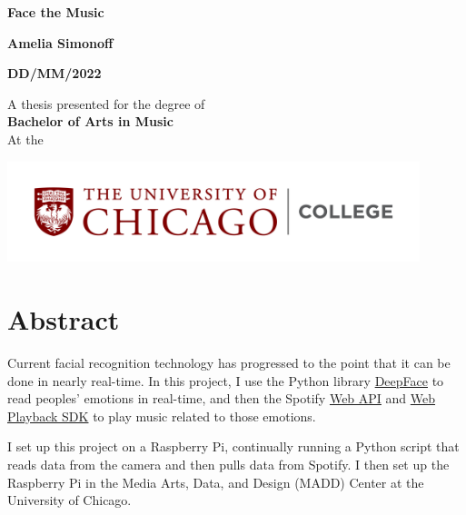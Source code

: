 \documentclass{article}
\title{}
\author{Amelia Simonoff, David Freedman}
\date{December 30 2020}
\renewcommand{\_}[1]{\underline{ #1 }}
\theoremstyle{definition}
\begin{document}
\begin{titlepage}
    \begin{center}
        \vspace*{1cm}
            
        \Huge
        \textbf{Face the Music}
            
        \vspace{0.5cm}
        \LARGE
            
        \vspace{1.5cm}
            
        \textbf{Amelia Simonoff}
        
        \textbf{DD/MM/2022}
            
        \vfill
            
        A thesis presented for the degree of\\
        \textbf{Bachelor of Arts in Music} \\
        At the
        
        \vspace{0.8cm}
            
        \includegraphics[width=0.9\textwidth]{UChicago_College_Horizontal_Color_RGB.png}

        \Large
            
    \end{center}
\end{titlepage}

\section{Abstract}

Current facial recognition technology has progressed to the point that it can be done in nearly real-time. In this project, I use the Python library \href{https://pypi.org/project/deepface/}{DeepFace} to read peoples' emotions in real-time, and then the Spotify \href{https://developer.spotify.com/documentation/web-api/reference/}{Web API} and \href{https://developer.spotify.com/documentation/web-playback-sdk/reference/}{Web Playback SDK} to play music related to those emotions.

I set up this project on a Raspberry Pi, continually running a Python script that reads data from the camera and then pulls data from Spotify. I then set up the Raspberry Pi in the Media Arts, Data, and Design (MADD) Center at the University of Chicago. 
\end{document}
